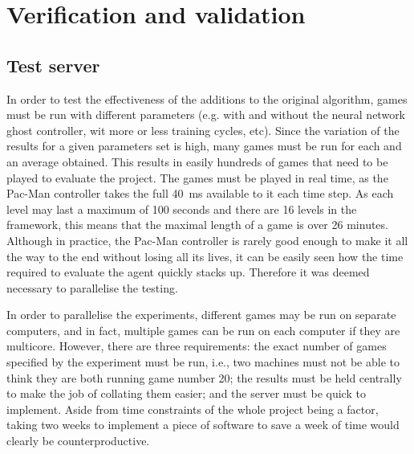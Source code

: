 \chapter{Verification and validation}
\label{ch:verification}

\section{Test server}


In order to test the effectiveness of the additions to the original algorithm, games must be run with different parameters (e.g. with and without the neural network ghost controller, wit more or less training cycles, etc).  Since the variation of the results for a given parameters set is high, many games must be run for each and an average obtained.  This results in easily hundreds of games that need to be played to evaluate the project.  The games must be played in real time, as the Pac-Man controller takes the full 40~ms available to it each time step.  As each level may last a maximum of 100 seconds and there are 16 levels in the framework, this means that the maximal length of a game is over 26 minutes.  Although in practice, the Pac-Man controller is rarely good enough to make it all the way to the end without losing all its lives, it can be easily seen how the time required to evaluate the agent quickly stacks up.  Therefore it was deemed necessary to parallelise the testing.

In order to parallelise the experiments, different games may be run on separate computers, and in fact, multiple games can be run on each computer if they are multicore.  However, there are three requirements: the exact number of games specified by the experiment must be run, i.e., two machines must not be able to think they are both running game number 20; the results must be held centrally to make the job of collating them easier; and the server must be quick to implement.  Aside from time constraints of the whole project being a factor, taking two weeks to implement a piece of software to save a week of time would clearly be counterproductive.

